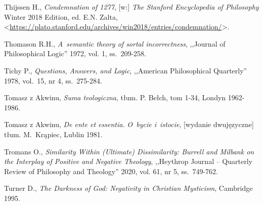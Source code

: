\begin{thebibliography}{100}
Thijssen H., \textit{Condemnation of 1277}, [w:] \textit{The Stanford Encyclopedia of Philosophy}
Winter 2018 Edition, ed. E.N. Zalta, {\textless}\url{https://plato.stanford.edu/archives/win2018/entries/condemnation/}{\textgreater}.

Thomason R.H., \textit{A~semantic theory of sortal incorrectness}, ,,Journal of Philosophical Logic'' 1972, vol. 1, ss.~209-258.


Tichy P., \textit{Questions, Answers, and Logic}, ,,American Philosophical Quarterly'' 1978, vol.~15, nr 4, ss.~275-284.



Tomasz z Akwinu, \textit{Suma teologiczna}, tłum. P. Bełch, tom 1-34, Londyn 1962-1986.

Tomasz z Akwinu, \textit{De ente et essentia.} \textit{O~bycie i~istocie}, [wydanie dwujęzyczne] tłum. M.~Krąpiec, Lublin 1981.


Tromans O., \textit{Similarity Within (Ultimate) Dissimilarity: Burrell and Milbank on the Interplay of Positive and Negative Theology},
,,Heythrop Journal -- Quarterly Review of Philosophy and Theology'' 2020, vol. 61, nr 5, ss.~749-762.

Turner D., \textit{The Darkness of God: Negativity in Christian Mysticism}, Cambridge 1995.



\end{thebibliography}
